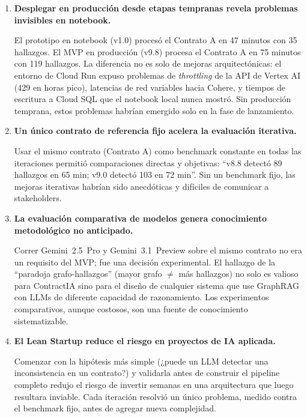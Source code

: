 \begin{enumerate}

    \item \textbf{Desplegar en producción desde etapas tempranas revela problemas invisibles en notebook.}

    El prototipo en notebook (v1.0) procesó el Contrato A en 47 minutos
    con 35 hallazgos. El MVP en producción (v9.8) procesa el Contrato A
    en 75 minutos con 119 hallazgos. La diferencia no es solo de mejoras
    arquitectónicas: el entorno de Cloud Run expuso problemas de
    \textit{throttling} de la API de Vertex AI (429 en horas pico), latencias
    de red variables hacia Cohere, y tiempos de escritura a Cloud SQL que
    el notebook local nunca mostró. Sin producción temprana, estos problemas
    habrían emergido solo en la fase de lanzamiento.

    \item \textbf{Un único contrato de referencia fijo acelera la evaluación iterativa.}

    Usar el mismo contrato (Contrato A) como benchmark constante
    en todas las iteraciones permitió comparaciones directas y objetivas:
    ``v8.8 detectó 89 hallazgos en 65 min; v9.0 detectó 103 en 72 min''.
    Sin un benchmark fijo, las mejoras iterativas habrían sido anecdóticas
    y difíciles de comunicar a stakeholders.

    \item \textbf{La evaluación comparativa de modelos genera conocimiento metodológico no anticipado.}

    Correr Gemini~2.5~Pro y Gemini~3.1~Preview sobre el mismo contrato
    no era un requisito del MVP; fue una decisión experimental. El hallazgo
    de la ``paradoja grafo-hallazgos'' (mayor grafo $\neq$ más hallazgos)
    no solo es valioso para ContractIA sino para el diseño de cualquier
    sistema que use GraphRAG con LLMs de diferente capacidad de razonamiento.
    Los experimentos comparativos, aunque costosos, son una fuente de
    conocimiento sistematizable.

    \item \textbf{El Lean Startup reduce el riesgo en proyectos de IA aplicada.}

    Comenzar con la hipótesis más simple (¿puede un LLM detectar una
    inconsistencia en un contrato?) y validarla antes de construir el
    pipeline completo redujo el riesgo de invertir semanas en una
    arquitectura que luego resultara inviable. Cada iteración resolvió
    un único problema, medido contra el benchmark fijo, antes de agregar
    nueva complejidad.

\end{enumerate}

